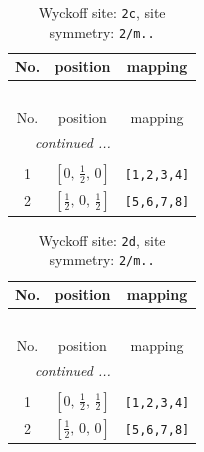 \documentclass[fleqn,8pt]{jsarticle}
\begin{document}
\renewcommand{\arraystretch}{1.2}
\begin{longtable}{ccc}
\caption{Wyckoff site: {\tt 2c}, site symmetry: {\tt 2/m..}}
 \\
 \hline \hline
No. & position & mapping \\ \hline \endfirsthead

\multicolumn{2}{l}{\tablename\ \thetable{}} \\
 \hline \hline
No. & position & mapping \\ \hline \endhead

 \hline \hline
\multicolumn{2}{r}{\footnotesize\it continued ...} \\ \endfoot

 \hline \hline
\multicolumn{2}{r}{} \\ \endlastfoot

1 & $\left[ 0,\, \frac{1}{2},\, 0 \right]$ & {\tt [1,2,3,4]} \\ \hline
2 & $\left[ \frac{1}{2},\, 0,\, \frac{1}{2} \right]$ & {\tt [5,6,7,8]} \\
\end{longtable}
\renewcommand{\arraystretch}{1.2}
\begin{longtable}{ccc}
\caption{Wyckoff site: {\tt 2d}, site symmetry: {\tt 2/m..}}
 \\
 \hline \hline
No. & position & mapping \\ \hline \endfirsthead

\multicolumn{2}{l}{\tablename\ \thetable{}} \\
 \hline \hline
No. & position & mapping \\ \hline \endhead

 \hline \hline
\multicolumn{2}{r}{\footnotesize\it continued ...} \\ \endfoot

 \hline \hline
\multicolumn{2}{r}{} \\ \endlastfoot

1 & $\left[ 0,\, \frac{1}{2},\, \frac{1}{2} \right]$ & {\tt [1,2,3,4]} \\ \hline
2 & $\left[ \frac{1}{2},\, 0,\, 0 \right]$ & {\tt [5,6,7,8]} \\
\end{longtable}
\renewcommand{\arraystretch}{1.2}
\end{document}
